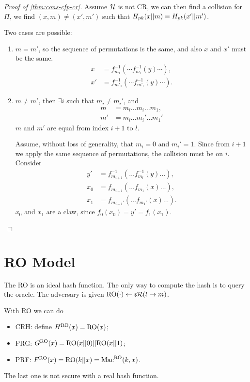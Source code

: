 \begin{proof}[Proof of \cref{thm:cons-cfp-cr}]
	Assume $\mathcal{H}$ is not \ac{CR}, we can then find a collision for $\Pi$, \ie we find $(x,m) \neq (x',m')$ such that $H_{pk}(x || m) = H_{pk} (x' || m')$.

	Two cases are possible:
	\begin{enumerate}
		\item $m = m'$, so the sequence of permutations is the same, and also $x$ and $x'$ must be the same.
			\begin{align*}
				x & = f_{m_1}^{-1}( \cdots f_{m_l}^{-1}( y) \cdots ), \\
				x' & = f_{m'_1}^{-1}( \cdots f_{m'_l}^{-1}( y) \cdots ).
			\end{align*}
		\item $m \neq m'$, then $\exists i$ such that $m_i \neq m_i'$, and
			\begin{align*}
				m & = m_l \dots m_i \dots m_1, \\
				m' & = m_l \dots m_i' \dots m_1'
			\end{align*}
			\ie $m$ and $m'$ are equal from index $i+1$ to $l$.

			Assume, without loss of generality, that $m_i = 0$ and $m_i' = 1$.
			Since from $i+1$ we apply the same sequence of permutations, the collision must be on $i$.
			Consider
			\begin{align*}
				y' & = f_{m_{i+1}}^{-1}( \dots f_{m_l}^{-1} (y) \dots), \\
				x_0 & = f_{m_{i-1}} (\dots f_{m_1} (x) \dots ), \\
				x_1 & = f_{m_{i-1}'} (\dots f_{m_1'} (x) \dots ).
			\end{align*}
			$x_0$ and $x_1$ are a claw, since $f_0(x_0) = y' = f_1(x_1)$. \qedhere
	\end{enumerate}
\end{proof}

\section{\acl{RO} Model}

The \ac{RO} is an ideal hash function.
The only way to compute the hash is to query the oracle.
The adversary is given $\mathrm{RO}(\cdot) \leftarrow {\scriptstyle \$} {\mathcal{R}(l \to m)}$.

With \ac{RO} we can do
\begin{itemize}
	\item \ac{CRH}: define $H^{\mathrm{RO}}(x) = \mathrm{RO}(x)$;
	\item \ac{PRG}: $G^{\mathrm{RO}}(x) = \mathrm{RO}(x || 0) || \mathrm{RO}(x || 1)$;
	\item \ac{PRF}: $F^{\mathrm{RO}}(x) = \mathrm{RO}(k || x) = \mathrm{Mac}^{\mathrm{RO}}(k, x)$.
\end{itemize}
The last one is not secure with a real hash function.
